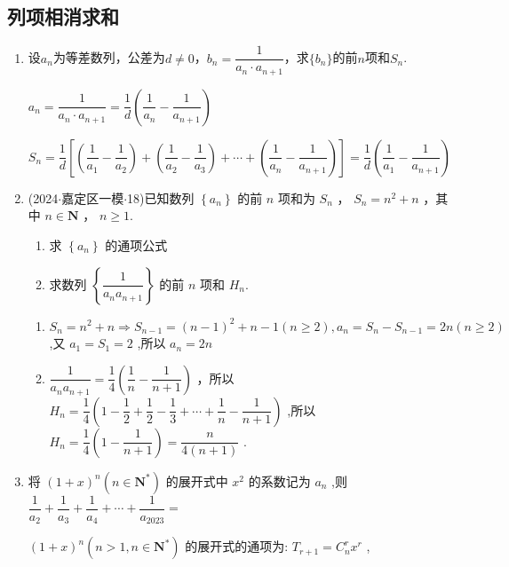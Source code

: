 \subsection*{列项相消求和}
\begin{enumerate}
    \item 设$a_n$为等差数列，公差为$d \neq 0$，$b_n = \dfrac{1}{a_n \cdot a_{n+1}}$，求$\{b_n\}$的前$n$项和$S_n$.
    \begin{jieda}
        $a_n = \dfrac{1}{a_n \cdot a_{n+1}} = \dfrac{1}{d}\left(\dfrac{1}{a_n} - \dfrac{1}{a_{n+1}}\right)$

        $S_n = \dfrac{1}{d} \left[\left(\dfrac{1}{a_1} - \dfrac{1}{a_2}\right) + \left(\dfrac{1}{a_2} - \dfrac{1}{a_3}\right) + \cdots + \left(\dfrac{1}{a_n} - \dfrac{1}{a_{n+1}}\right)\right] = \dfrac{1}{d}\left(\dfrac{1}{a_1} - \dfrac{1}{a_{n+1}}\right)$
    \end{jieda}
    \item (2024$\cdot$嘉定区一模$\cdot$18)已知数列 $\left\{  {a}_{n}\right\}$ 的前 $n$ 项和为 ${S}_{n}$ ， ${S}_{n} = {n}^{2} + n$ ，其中 $n \in  \mathbf{N}$ ， $n \geq  1$.
    \begin{enumerate}
        \item 求 $\left\{  {a}_{n}\right\}$ 的通项公式
        \item 求数列 $\left\{  \dfrac{1}{{a}_{n}{a}_{n + 1}}\right\}$ 的前 $n$ 项和 ${H}_{n}$.
    \end{enumerate}
    \begin{jieda}
        \begin{enumerate}
            \item ${S}_{n} = {n}^{2} + n \Longrightarrow  {S}_{n - 1} = {\left( n - 1\right) }^{2} + n - 1\left( {n \geq  2}\right) ,{a}_{n} =  {S}_{n} - {S}_{n - 1} = {2n}\left( {n \geq  2}\right)$ ,又 ${a}_{1} = {S}_{1} = 2$ ,所以 ${a}_{n} = {2n}$
            
            \item $\dfrac{1}{{a}_{n}{a}_{n + 1}} = \dfrac{1}{4}\left( {\dfrac{1}{n} - \dfrac{1}{n + 1}}\right)$ ，所以 ${H}_{n} = \dfrac{1}{4}\left( {1 - \dfrac{1}{2} + \dfrac{1}{2} - }\right.  \left. {\dfrac{1}{3} + \cdots  + \dfrac{1}{n} - \dfrac{1}{n + 1}}\right)$ ,所以 ${H}_{n} = \dfrac{1}{4}\left( {1 - \dfrac{1}{n + 1}}\right)  = \dfrac{n}{4\left( {n + 1}\right) }$ .
        \end{enumerate}
    \end{jieda}
    \item 将 ${\left( 1 + x\right) }^n\left( {n \in  {\mathbf{N}}^{ * }}\right)$ 的展开式中 ${x}^2$ 的系数记为 ${a}_n$ ,则 $\dfrac{1}{{a}_2} + \dfrac{1}{{a}_3} + \dfrac{1}{{a}_4} + \cdots  + \dfrac{1}{{a}_{2023}} =$
    \begin{jieda}
        ${\left( 1 + x\right) }^n\left( {n > 1,n \in  {\mathbf{N}}^{ * }}\right)$ 的展开式的通项为: ${T}_{r + 1} = {{C}}_n^r{x}^r$ ,


\end{jieda}
\end{enumerate}
